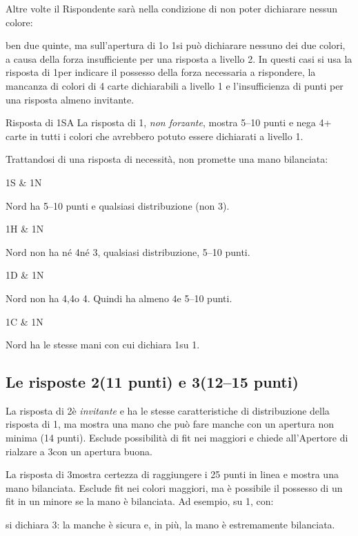 \documentclass[../corsofiori.tex]{subfiles}
\begin{document}
Altre volte il Rispondente sarà nella condizione di non poter dichiarare nessun colore:


\noindent
ben due quinte, ma sull'apertura di 1\He o 1\Sp si può dichiarare nessuno dei due colori, a causa della forza
insufficiente per una risposta a livello 2. In questi casi si usa la risposta di 1\SA per indicare il possesso della
forza necessaria a rispondere, la mancanza di colori di 4 carte dichiarabili a livello 1 e l'insufficienza di punti per
una risposta almeno invitante.

\begin{regola}{Risposta di 1{\small SA}}
    La risposta di 1\SA, \emph{non forzante}, mostra 5--10 punti e nega 4+ carte in tutti i colori che avrebbero
    potuto essere dichiarati a livello 1.
\end{regola}

Trattandosi di una risposta di necessità, non promette una mano bilanciata:

\smallskip
{}
\begin{biddingpair}
    1S & 1N\\
\end{biddingpair} \quad Nord ha 5--10 punti e qualsiasi distribuzione (non 3\Sp).

\smallskip
\begin{biddingpair}
    1H & 1N\\
\end{biddingpair} \quad Nord non ha né 4\Sp né 3\He, qualsiasi distribuzione, 5--10 punti.\\

\smallskip
\begin{biddingpair}
    1D & 1N\\
\end{biddingpair} \quad Nord non ha 4\Sp,4\He o 4\Di. Quindi ha almeno 4\Cl e 5--10 punti.\\


\smallskip
\begin{biddingpair}
    1C & 1N\\
\end{biddingpair} \quad Nord ha le stesse mani con cui dichiara 1\SA su 1\Di.

\subsection{Le risposte 2\SA (11 punti) e 3\SA (12--15 punti)}

La risposta di 2\SA è \emph{invitante} e ha le stesse caratteristiche di distribuzione della risposta di 1\SA, ma
mostra una mano che può fare manche con un apertura non minima (14 punti). Esclude possibilità di fit nei maggiori
e chiede all'Apertore di rialzare a 3\SA con un apertura buona.

La risposta di 3\SA mostra certezza di raggiungere i 25 punti in linea e mostra una mano bilanciata. Esclude fit nei
colori maggiori, ma è possibile il possesso di un fit in un minore se la mano è bilanciata. Ad esempio, su 1\Di, con:

\smallskip
{}

\noindent si dichiara 3\SA: la manche è sicura e, in più, la mano è estremamente bilanciata.
\end{document}
